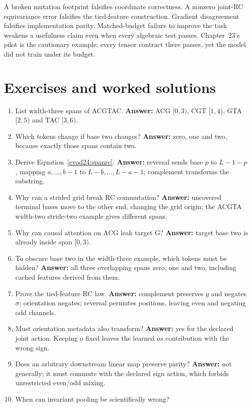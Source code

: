 A broken mutation footprint falsifies coordinate correctness. A nonzero joint-RC
equivariance error falsifies the tied-feature construction. Gradient disagreement
falsifies implementation parity. Matched-budget failure to improve the task
weakens a usefulness claim even when every algebraic test passes. Chapter~23's
pilot is the cautionary example: every tensor contract there passes, yet the model did
not train under its budget.

\section{Exercises and worked solutions}
\begin{enumerate}
\item List width-three spans of ACGTAC.
\textbf{Answer:} ACG $[0,3)$, CGT $[1,4)$, GTA $[2,5)$ and TAC $[3,6)$.
\item Which tokens change if base two changes?
\textbf{Answer:} zero, one and two, because exactly those spans contain two.
\item Derive Equation~\ref{evod24:spanrc}.
\textbf{Answer:} reversal sends base $p$ to $L-1-p$, mapping
$a,\ldots,b-1$ to $L-b,\ldots,L-a-1$; complement transforms the substring.
\item Why can a strided grid break RC commutation?
\textbf{Answer:} uncovered terminal bases move to the other end, changing the
grid origin; the ACGTA width-two stride-two example gives different spans.
\item Why can causal attention on ACG leak target G?
\textbf{Answer:} target base two is already inside span $[0,3)$.
\item To obscure base two in the width-three example, which tokens must be hidden?
\textbf{Answer:} all three overlapping spans zero, one and two, including cached
features derived from them.
\item Prove the tied-feature RC law.
\textbf{Answer:} complement preserves $g$ and negates $\sigma$; orientation
negates; reversal permutes positions, leaving even and negating odd channels.
\item Must orientation metadata also transform?
\textbf{Answer:} yes for the declared joint action. Keeping $o$ fixed leaves the
learned $os$ contribution with the wrong sign.
\item Does an arbitrary downstream linear map preserve parity?
\textbf{Answer:} not generally; it must commute with the declared sign action,
which forbids unrestricted even/odd mixing.
\item When can invariant pooling be scientifically wrong?

\end{enumerate}
